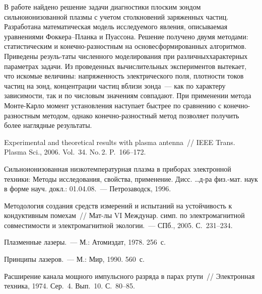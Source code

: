\begin{multicols}{2}
      В работе найдено решение задачи диагностики плоским зондом сильноионизованной плазмы с 
учетом столкновений заряженных частиц. Разработана математическая модель исследуемого явления, 
описываемая уравнениями Фок\-ке\-ра--План\-ка и Пуассона. Решение получено двумя методами:\linebreak 
статистическим и ко\-неч\-но-раз\-ност\-ным на основе\linebreak сформированных алгоритмов. Приведены 
резуль-\linebreak таты численного моделирования при различных\linebreak характерных параметрах задачи.
 Из  проведенных 
вычислительных экспериментов вытекает, что искомые величины: напряженность 
электрического поля, плотности токов частиц на зонд, концентрации частиц вблизи зонда~--- как по 
характеру зависимости, так и по числовым значениям совпадают. При применении метода 
      Мон\-те-Кар\-ло момент установления наступает быстрее по сравнению с конечно-разностным 
методом, однако конечно-разностный метод позволяет получить более наглядные результаты.

{\small\frenchspacing
{%
\begin{thebibliography}{99}

Experimental and theoretical results with plasma antenna~// IEEE Trans. Plasma Sci., 2006. Vol.~34. 
No.\,2. P.~166--172.

Сильноионизованная низкотемпературная плазма в приборах электронной техники: Методы 
исследования, свойства, применение. Дисс. \ldots д-ра физ.-мат. наук в форме науч. докл.: 
01.04.08.~--- Пет\-ро\-за\-водск, 1996.

Методология создания средств измерений и испытаний на устойчивость к кондуктивным помехам~// 
Мат-лы VI Междунар. симп. по электромагнитной совместимости и 
электромагнитной экологии.~--- СПб., 2005. С.~231--234.

Плазменные лазеры.~--- М.: Атомиздат, 1978.  256~с.

Принципы лазеров.~--- М.: Мир, 1990.  560~с.

Расширение канала мощного импульсного разряда в парах ртути~// Электронная техника, 1974. 
Сер.~4. Вып.~10. С.~80--85. 


\end{thebibliography}}}
\end{multicols}
